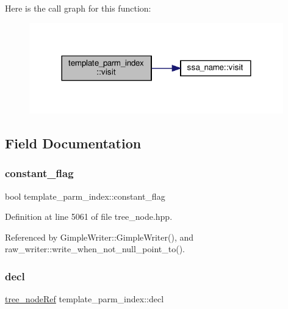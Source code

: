 Here is the call graph for this function\+:
\nopagebreak
\begin{figure}[H]
\begin{center}
\leavevmode
\includegraphics[width=312pt]{d0/d09/structtemplate__parm__index_a93264afe632fd02f7c454a429036064e_cgraph}
\end{center}
\end{figure}


\subsection{Field Documentation}
\mbox{\label{structtemplate__parm__index_a9516be13be1e6c6f32f6129b706ca4b0}} 
\subsubsection{\texorpdfstring{constant\+\_\+flag}{constant\_flag}}
{\footnotesize\ttfamily bool template\+\_\+parm\+\_\+index\+::constant\+\_\+flag}



Definition at line 5061 of file tree\+\_\+node.\+hpp.



Referenced by Gimple\+Writer\+::\+Gimple\+Writer(), and raw\+\_\+writer\+::write\+\_\+when\+\_\+not\+\_\+null\+\_\+point\+\_\+to().

\mbox{\label{structtemplate__parm__index_a801c6ca992f71ef5ba0dcb9cc080a00d}} 
\subsubsection{\texorpdfstring{decl}{decl}}
{\footnotesize\ttfamily \hyperlink{tree__node_8hpp_a6ee377554d1c4871ad66a337eaa67fd5}{tree\+\_\+node\+Ref} template\+\_\+parm\+\_\+index\+::decl}



